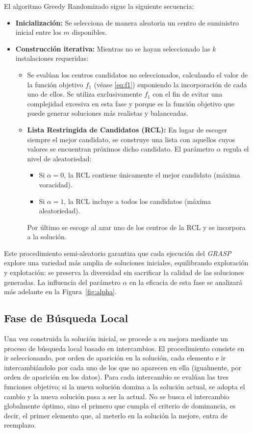 \documentclass[12pt,a4paper]{book}
\begin{document}
El algoritmo Greedy Randomizado sigue la siguiente secuencia:  

\begin{itemize}
    \item \textbf{Inicialización:} Se selecciona de manera aleatoria un centro de suministro inicial entre los $m$ disponibles.
    \item \textbf{Construcción iterativa:} Mientras no se hayan seleccionado las $k$ instalaciones requeridas:
    \begin{itemize}
        \item Se evalúan los centros candidatos no seleccionados, calculando el valor de la función objetivo $f_1$ (véase \ref{eq:f1}) suponiendo la incorporación de cada uno de ellos. Se utiliza exclusivamente $f_1$ con el fin de evitar una complejidad excesiva en esta fase y porque es la función objetivo que puede generar soluciones más realistas y balanceadas.
        \item \textbf{Lista Restringida de Candidatos (RCL):} En lugar de escoger siempre el mejor candidato, se construye una lista con aquellos cuyos valores se encuentran próximos dicho candidato. El parámetro $\alpha$ regula el nivel de aleatoriedad:
        \begin{itemize}
            \item Si $\alpha = 0$, la RCL contiene únicamente el mejor candidato (máxima voracidad).
            \item Si $\alpha = 1$, la RCL incluye a todos los candidatos (máxima aleatoriedad).
        \end{itemize}
        Por último se escoge al azar uno de los centros de la RCL y se incorpora a la solución.
    \end{itemize}
\end{itemize}

Este procedimiento semi-aleatorio garantiza que cada ejecución del \textit{GRASP} explore una variedad más amplia de soluciones iniciales, equilibrando exploración y explotación: se preserva la diversidad sin sacrificar la calidad de las soluciones generadas. La influencia del parámetro $\alpha$ en la eficacia de esta fase se analizará más adelante en la Figura~\ref{fig:alpha}.

\subsection{Fase de Búsqueda Local}
Una vez construida la solución inicial, se procede a su mejora mediante un proceso de búsqueda local basado en intercambios. El procedimiento consiste en ir seleccionando, por orden de aparición en la solución, cada elemento e ir intercambiándolo por cada uno de los que no aparecen en ella (igualmente, por orden de aparición en los datos). Para cada intercambio se evalúan las tres funciones objetivo; si la nueva solución domina a la solución actual, se adopta el cambio y la nueva solución pasa a ser la actual. No se busca el intercambio globalmente óptimo, sino el primero que cumpla el criterio de dominancia, es decir, el primer elemento que, al meterlo en la solución la mejore, entra de reemplazo. 
\end{document}
